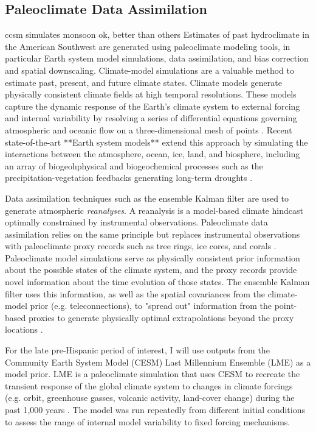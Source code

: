 \documentclass[fleqn,10pt]{wlscirep}
\begin{document}
\subsection*{Paleoclimate Data Assimilation}
ccsm simulates monsoon ok, better than others
Estimates of past hydroclimate in the American Southwest are generated using paleoclimate modeling tools, in particular Earth system model simulations, data assimilation, and bias correction and spatial downscaling. Climate-model simulations are a valuable method to estimate past, present, and future climate states. Climate models generate physically consistent climate fields at high temporal resolutions. These models capture the dynamic response of the Earth’s climate system to external forcing and internal variability by resolving a series of differential equations governing atmospheric and oceanic flow on a three-dimensional mesh of points \cite{Gettelman}. Recent state-of-the-art **Earth system models** extend this approach by simulating the interactions between the atmosphere, ocean, ice, land, and biosphere, including an array of biogeohphysical and biogeochemical processes such as the precipitation-vegetation feedbacks generating long-term droughts \cite{Hurrell2013,Kay2015,Gettelman}.

Data assimilation techniques such as the ensemble Kalman filter are used to generate atmospheric \textit{reanalyses}. A reanalysis is a model-based climate hindcast optimally constrained by instrumental observations. Paleoclimate data assimilation relies on the same principle but replaces instrumental observations with paleoclimate proxy records such as tree rings, ice cores, and corals \cite{Hakim2016TheResults}. Paleoclimate model simulations serve as physically consistent prior information about the possible states of the climate system, and the proxy records provide novel information about the time evolution of those states. The ensemble Kalman filter uses this information, as well as the spatial covariances from the climate-model prior (e.g. teleconnections), to "spread out" information from the point-based proxies to generate physically optimal extrapolations beyond the proxy locations \cite{Acevedo2015TowardsTechniques,Hakim2016TheResults}.

For the late pre-Hispanic period of interest, I will use outputs from the Community Earth System Model (CESM) Last Millennium Ensemble (LME) as a model prior. LME is a paleoclimate simulation that uses CESM to recreate the transient response of the global climate system to changes in climate forcings (e.g. orbit, greenhouse gasses, volcanic activity, land-cover change) during the past 1,000 years \cite{Otto-bliesner2015}. The model was run repeatedly from different initial conditions to assess the range of internal model variability to fixed forcing mechanisms.
\end{document}
